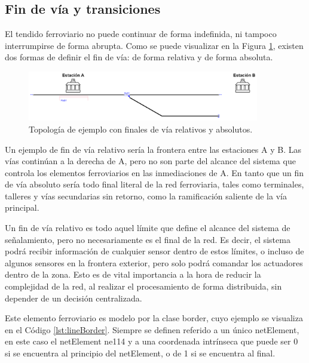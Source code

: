 \subsection{Fin de vía y transiciones}
    \label{sec:bufferstop}

    El tendido ferroviario no puede continuar de forma indefinida, ni tampoco interrumpirse de forma abrupta. Como se puede visualizar en la Figura \ref{fig:frontera_1}, existen dos formas de definir el fin de vía: de forma relativa y de forma absoluta.

    \begin{figure}[!h]
        \centering
        \includegraphics[width=0.9\textwidth]{Figuras/Border.png}
        \centering\caption{Topología de ejemplo con finales de vía relativos y absolutos.}
        \label{fig:frontera_1}
    \end{figure}

    Un ejemplo de fin de vía relativo sería la frontera entre las estaciones A y B. Las vías continúan a la derecha de A, pero no son parte del alcance del sistema que controla los elementos ferroviarios en las inmediaciones de A. En tanto que un fin de vía absoluto sería todo final literal de la red ferroviaria, tales como terminales, talleres y vías secundarias sin retorno, como la ramificación saliente de la vía principal.
    
    Un fin de vía relativo es todo aquel límite que define el alcance del sistema de señalamiento, pero no necesariamente es el final de la red. Es decir, el sistema podrá recibir información de cualquier sensor dentro de estos límites, o incluso de algunos sensores en la frontera exterior, pero solo podrá comandar los actuadores dentro de la zona. Esto es de vital importancia a la hora de reducir la complejidad de la red, al realizar el procesamiento de forma distribuida, sin depender de un decisión centralizada.

    Este elemento ferroviario es modelo por la clase border, cuyo ejemplo se visualiza en el Código \ref{lst:lineBorder}. Siempre se definen referido a un único netElement, en este caso el netElement ne114 y a una coordenada intrínseca que puede ser 0 si se encuentra al principio del netElement, o de 1 si se encuentra al final.

